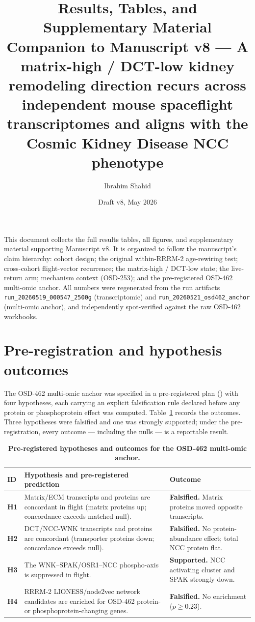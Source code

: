 \documentclass[10pt]{article}
\title{\textbf{Results, Tables, and Supplementary Material}\\[0.3em]
\large Companion to Manuscript v8 --- A matrix-high / DCT-low kidney remodeling direction recurs across\\independent mouse spaceflight transcriptomes and aligns with the Cosmic Kidney Disease NCC phenotype}
\author{Ibrahim Shahid}
\date{Draft v8, May 2026}
\newcommand{\code}[1]{\texttt{#1}}
\begin{document}
\maketitle
\thispagestyle{fancy}

\noindent
This document collects the full results tables, all figures, and supplementary material supporting Manuscript v8. It is organized to follow the manuscript's claim hierarchy: cohort design; the original within-RRRM-2 age-rewiring test; cross-cohort flight-vector recurrence; the matrix-high / DCT-low state; the live-return arm; mechanism context (OSD-253); and the pre-registered OSD-462 multi-omic anchor. All numbers were regenerated from the run artifacts \code{run\_20260519\_000547\_2500g} (transcriptomic) and \code{run\_20260521\_osd462\_anchor} (multi-omic anchor), and independently spot-verified against the raw OSD-462 workbooks.

\tableofcontents
\clearpage

\section{Pre-registration and hypothesis outcomes}

The OSD-462 multi-omic anchor was specified in a pre-registered plan () with four hypotheses, each carrying an explicit falsification rule declared before any protein or phosphoprotein effect was computed. Table~\ref{tab:hyp} records the outcomes. Three hypotheses were falsified and one was strongly supported; under the pre-registration, every outcome --- including the nulls --- is a reportable result.

\begin{table}[H]
\centering\small
\caption{\textbf{Pre-registered hypotheses and outcomes for the OSD-462 multi-omic anchor.}}
\label{tab:hyp}
\begin{tabularx}{\textwidth}{>{\bfseries}p{}X p{}}
\toprule
ID & Hypothesis and pre-registered prediction & Outcome \\
\midrule
H1 & Matrix/ECM transcripts and proteins are concordant in flight (matrix proteins up; concordance exceeds matched null). & \textbf{Falsified.} Matrix proteins moved opposite transcripts. \\
H2 & DCT/NCC-WNK transcripts and proteins are concordant (transporter proteins down; concordance exceeds null). & \textbf{Falsified.} No protein-abundance effect; total NCC protein flat. \\
H3 & The WNK--SPAK/OSR1--NCC phospho-axis is suppressed in flight. & \textbf{Supported.} NCC activating cluster and SPAK strongly down. \\
H4 & RRRM-2 LIONESS/node2vec network candidates are enriched for OSD-462 protein- or phosphoprotein-changing genes. & \textbf{Falsified.} No enrichment ($p\geq0.23$). \\
\bottomrule
\end{tabularx}
\end{table}
\end{document}

